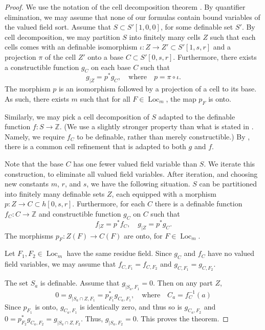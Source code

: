 \documentclass[12pt]{amsart}
\newcommand{\op}[1]{\operatorname{#1}}
\newcommand{\ring}[1]{{\mathbb #1}}
\theoremstyle{plain}
\theoremstyle{definition}
\begin{document}
\begin{proof} We use the notation of the cell decomposition theorem
  \cite[Theorem 7.2.1]{CL}.  By quantifier elimination, we may assume
  that none of our formulas contain bound variables of the valued
  field sort.  Assume that $S\subset S'[1,0,0]$, for some definable set
  $S'$.  By cell decomposition, we may partition $S$ into finitely many
  cells $Z$ such that each cells comes with an definable isomorphism
  $\iota:Z \to Z'\subset S'[1,s,r]$ and a projection $\pi$ of the
  cell $Z'$ onto a base $C\subset S'[0,s,r]$.  Furthermore, there exists
  a constructible function $g_C$ on each base $C$ such that
\[
g_{|Z} = p^* g_C, \quad\text{where}\quad p = \pi\circ\iota.
\]
The morphism $p$ is an isomorphism followed by a
projection of a cell to its base.  As such, there exists $m$ such that
for all $F\in \op{Loc}_m$, the map $p_F$ is onto.

Similarly, we may pick a cell decomposition of $S$ adapted to the
definable function $f:S\to \ring{Z}$.  (We use a slightly stronger
property than what is stated in \cite{CL}.  Namely, we require $f_C$ to
be definable, rather than merely constructible.)  By \cite[Prop
7.3.2]{CL}, there is a common cell refinement that is adapted to both
$g$ and $f$.

Note that the base $C$ has one fewer valued field variable than $S$.
We iterate this construction, to eliminate all valued field variables.
After iteration, and choosing new constants $m$, $r$, and $s$, we
have the following situation.  $S$ can be partitioned into finitely
many definable sets $Z$, each equipped with a morphism $p:Z\to
C\subset h[0,s,r]$.  Furthermore, for each $C$ there is a definable
function $f_C:C\to\ring{Z}$ and constructible function $g_C$ on $C$
such that
\[
f_{|Z} = p^* f_C,\quad  g_{|Z} = p^* g_C.
\]
The morphisms $p_F:Z(F)\to C(F)$ are onto, for $F\in\op{Loc}_m$.

Let $F_1,F_2\in\op{Loc}_m$ have the same residue field.  Since $g_C$ and
$f_C$ have no valued field variables, we may assume that $f_{C,F_1} =
f_{C,F_2}$ and $g_{C,F_1} = g_{C,F_2}$.

The set $S_a$ is definable.  Assume that $g_{|S_a,F_1} = 0$.  Then on
any part $Z$,
\[
0 = g_{|S_a\cap Z,F_1} = p^*_{F_1} g_{C_a,F_1}, \quad\text{where}\quad C_a = f_C^{-1}(a)
\]
Since $p_{F_1}$ is onto, $g_{C_a,F_1}$ is identically zero, and thus so is
$g_{C_a,F_2}$ and $0 = p^*_{F_2} g_{C_a,F_2} = g_{|S_a\cap Z,F_2}$.  Thus,
$g_{|S_a,F_2}=0$.  This proves the theorem.
\end{proof}
\end{document}
